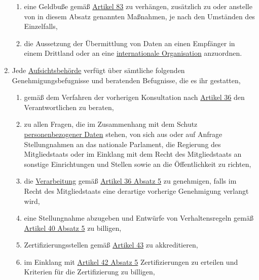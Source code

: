 \begin{enumerate}
\begin{enumerate}
    \item eine Geldbuße gemäß \hyperref[ch:83]{Artikel 83} zu verhängen, zusätzlich zu oder anstelle von in diesem
     Absatz genannten Maßnahmen, je nach den Umständen des Einzelfalls,
    \label{itm:58-2i}

    \item die Aussetzung der Übermittlung von Daten an einen Empfänger in einem Drittland oder an eine \hyperref[itm:04-29]{internationale
     Organisation} anzuordnen.
    \label{itm:58-2j}

  \end{enumerate}

  \item Jede \hyperref[itm:04-21]{Aufsichtsbehörde} verfügt über sämtliche folgenden Genehmigungsbefugnisse und beratenden Befugnisse, die es
   ihr gestatten,
  \label{itm:58-3}

  \begin{enumerate}
  
    \item gemäß dem Verfahren der vorherigen Konsultation nach \hyperref[ch:36]{Artikel 36} den Verantwortlichen zu
     beraten,
    \label{itm:58-3a}

    \item zu allen Fragen, die im Zusammenhang mit dem Schutz \hyperref[itm:04-1]{personenbezogener Daten} stehen, von sich aus oder auf
     Anfrage Stellungnahmen an das nationale Parlament, die Regierung des Mitgliedstaats oder im Einklang mit dem Recht
     des Mitgliedstaats an sonstige Einrichtungen und Stellen sowie an die Öffentlichkeit zu richten,
    \label{itm:58-3b}

    \item die \hyperref[itm:04-2]{Verarbeitung} gemäß \hyperref[itm:36-5]{Artikel 36 Absatz 5} zu genehmigen, falls im Recht des
     Mitgliedstaats eine derartige vorherige Genehmigung verlangt wird,
    \label{itm:58-3c}

    \item eine Stellungnahme abzugeben und Entwürfe von Verhaltensregeln gemäß \hyperref[itm:40-5]{Artikel 40 Absatz 5}
     zu billigen,
    \label{itm:58-3d}

    \item Zertifizierungsstellen gemäß \hyperref[ch:43]{Artikel 43} zu akkreditieren,
    \label{itm:58-3e}

    \item im Einklang mit \hyperref[itm:42-5]{Artikel 42 Absatz 5} Zertifizierungen zu erteilen und Kriterien für die
     Zertifizierung zu billigen,
    \label{itm:58-3f}


\end{enumerate}
\end{enumerate}
